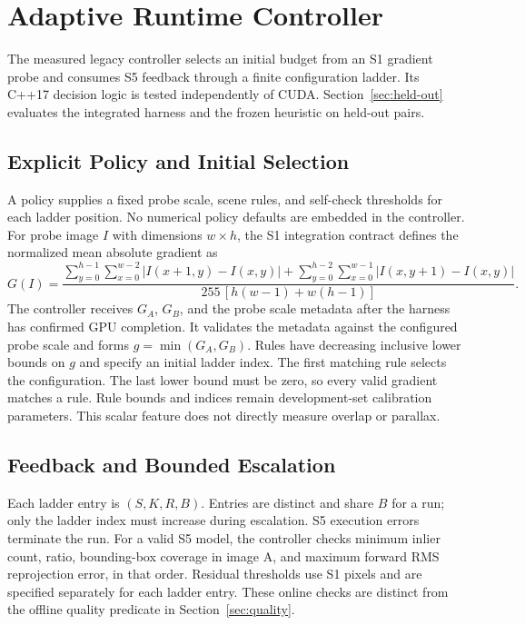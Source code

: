 \section{Adaptive Runtime Controller}
\label{sec:controller}
The measured legacy controller selects an initial budget from an S1 gradient
probe and consumes S5 feedback through a finite configuration ladder. Its
C++17 decision logic is tested independently of CUDA. Section~\ref{sec:held-out}
evaluates the integrated harness and the frozen heuristic on held-out pairs.

\subsection{Explicit Policy and Initial Selection}
A policy supplies a fixed probe scale, scene rules, and self-check thresholds
for each ladder position. No numerical policy defaults are embedded in the
controller. For probe image $I$ with dimensions $w\times h$, the S1 integration
contract defines the normalized mean absolute gradient as
\begin{equation}
 G(I)=\frac{\sum_{y=0}^{h-1}\sum_{x=0}^{w-2}|I(x+1,y)-I(x,y)|
 +\sum_{y=0}^{h-2}\sum_{x=0}^{w-1}|I(x,y+1)-I(x,y)|}
 {255\,[h(w-1)+w(h-1)]}.
\end{equation}
The controller receives $G_A$, $G_B$, and the probe scale metadata after the
harness has confirmed GPU completion. It validates the metadata against the configured probe scale
and forms $g=\min(G_A,G_B)$. Rules have decreasing inclusive lower bounds on $g$
and specify an initial ladder index. The first matching rule selects the
configuration. The last lower bound must be zero, so every valid gradient matches a rule.
Rule bounds and indices remain development-set calibration parameters. This
scalar feature does not directly measure overlap or parallax.

\subsection{Feedback and Bounded Escalation}
Each ladder entry is $(S,K,R,B)$. Entries are distinct and share $B$ for a run;
only the ladder index must increase during escalation. S5 execution errors
terminate the run. For a valid S5 model, the controller checks minimum inlier
count, ratio, bounding-box coverage in image A, and maximum forward RMS
reprojection error, in that order. Residual thresholds use S1 pixels and are
specified separately for each ladder entry. These online checks are distinct
from the offline quality predicate in Section~\ref{sec:quality}.

